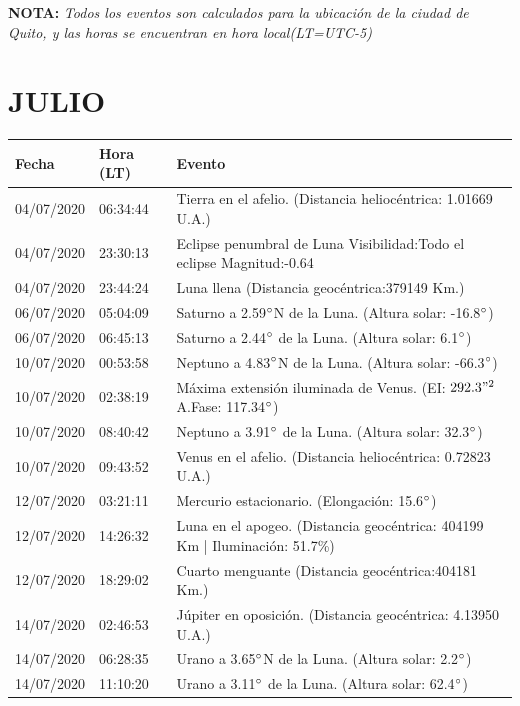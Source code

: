 \documentclass[12pt,a4paper,oneside]{article}
\begin{document}
\vspace{1cm}
\textbf{NOTA:  }\textit{Todos los eventos son calculados para la ubicaci\'on de la ciudad de Quito, y las horas se encuentran en hora local(LT=UTC-5)}
\vspace{0.7cm}
\newpage
\section{JULIO}
\begin{center}
\begin{tabular}{ |l| l| l| }
\hline
 \textbf{Fecha} & \textbf{Hora (LT)} & \textbf{Evento}\\
 \hline
04/07/2020 &  06:34:44   &  Tierra en el afelio. (Distancia heliocéntrica: 1.01669 U.A.)	  \\
04/07/2020 &  23:30:13   &  Eclipse penumbral de Luna Visibilidad:Todo el eclipse Magnitud:-0.64	  \\
04/07/2020 &  23:44:24   &  Luna llena (Distancia geocéntrica:379149 Km.)	  \\
06/07/2020 &  05:04:09   &  Saturno a 2.59$\degree$N de la Luna. (Altura solar: -16.8$\degree$)	  \\
06/07/2020 &  06:45:13   &  Saturno a 2.44$\degree$ de la Luna. (Altura solar: 6.1$\degree$)	  \\
10/07/2020 &  00:53:58   &  Neptuno a 4.83$\degree$N de la Luna. (Altura solar: -66.3$\degree$)	  \\
10/07/2020 &  02:38:19   &  Máxima extensión iluminada de Venus. (EI: $292.3"^2$ A.Fase: 117.34$\degree$) 	  \\
10/07/2020 &  08:40:42   &  Neptuno a 3.91$\degree$ de la Luna. (Altura solar: 32.3$\degree$)	  \\
10/07/2020 &  09:43:52   &  Venus en el afelio. (Distancia heliocéntrica: 0.72823 U.A.)	  \\
12/07/2020 &  03:21:11   &  Mercurio estacionario. (Elongación: 15.6$\degree$)	  \\
12/07/2020 &  14:26:32   &  Luna en el apogeo. (Distancia geocéntrica: 404199 Km | Iluminación: 51.7\%)	  \\
12/07/2020 &  18:29:02   &  Cuarto menguante (Distancia geocéntrica:404181 Km.)	  \\
14/07/2020 &  02:46:53   &  Júpiter en oposición. (Distancia geocéntrica: 4.13950 U.A.)	  \\
14/07/2020 &  06:28:35   &  Urano a 3.65$\degree$N de la Luna. (Altura solar: 2.2$\degree$)	  \\
14/07/2020 &  11:10:20   &  Urano a 3.11$\degree$ de la Luna. (Altura solar: 62.4$\degree$)	  \\

\end{tabular}
\end{center}
\end{document}
